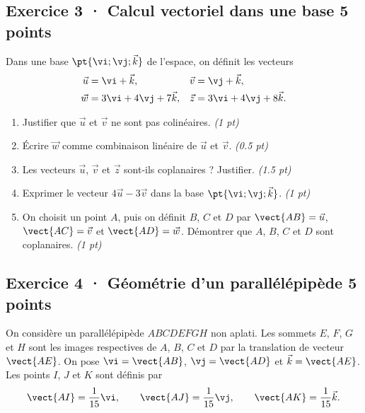 \mxnewpage{}

\subsection*{Exercice 3 · Calcul vectoriel dans une base \hfill 5 points}Dans une base $\pt{\vi;\vj;\vec k}$ de l'espace, on définit les vecteurs
\[\begin{aligned}\vec u&=\vi+\vec k,&\vec v&=\vj+\vec k,\\
\vec w&=3\vi+4\vj+7\vec k,&\vec z&=3\vi+4\vj+8\vec k.\end{aligned}\]

\begin{enumerate}

\item Justifier que $\vec u$ et $\vec v$ ne sont pas colinéaires. \hfill\textit{(1 pt)}

\item Écrire $\vec w$ comme combinaison linéaire de $\vec u$ et $\vec v$. \hfill\textit{(\num{0,5} pt)}

\item Les vecteurs $\vec u$, $\vec v$ et $\vec z$ sont-ils coplanaires ? Justifier. \hfill\textit{(\num{1,5} pt)}

\item Exprimer le vecteur $4\vec u-3\vec v$ dans la base $\pt{\vi;\vj;\vec k}$. \hfill\textit{(1 pt)}

\item On choisit un point $A$, puis on définit $B$, $C$ et $D$ par $\vect{AB}=\vec u$, $\vect{AC}=\vec v$ et $\vect{AD}=\vec w$. Démontrer que $A$, $B$, $C$ et $D$ sont coplanaires. \hfill\textit{(1 pt)}

\end{enumerate}

\subsection*{Exercice 4 · Géométrie d'un parallélépipède \hfill 5 points}On considère un parallélépipède $ABCDEFGH$ non aplati. Les sommets $E$, $F$, $G$ et $H$ sont les images respectives de $A$, $B$, $C$ et $D$ par la translation de vecteur $\vect{AE}$.
On pose $\vi=\vect{AB}$, $\vj=\vect{AD}$ et $\vec k=\vect{AE}$.
Les points $I$, $J$ et $K$ sont définis par
\[\vect{AI}=\frac1{15}\vi,\qquad\vect{AJ}=\frac1{15}\vj,\qquad\vect{AK}=\frac1{15}\vec k.\]

